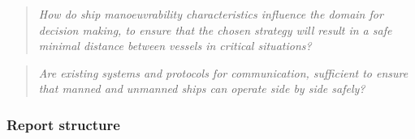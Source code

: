 \begin{quotation}
	\emph{How do ship manoeuvrability characteristics influence the domain for decision making, to ensure that the chosen strategy will result in a safe minimal distance between vessels in critical situations?} 
\end{quotation}

\begin{quotation}
	\emph{Are existing systems and protocols for communication, sufficient to ensure that manned and unmanned ships can operate side by side safely?}
\end{quotation}

\subsubsection*{Report structure}
%
%

